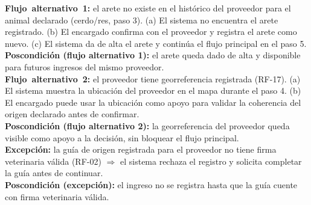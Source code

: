 \documentclass[11pt,a4paper]{article}
\begin{document}
\noindent\textbf{\mbox{Flujo alternativo 1}:} el arete no existe en el histórico del proveedor para el animal declarado (cerdo/res, paso 3). (a) El sistema no encuentra el arete registrado. (b) El encargado confirma con el proveedor y registra el arete como nuevo. (c) El sistema da de alta el arete y continúa el flujo principal en el paso 5.\\
\textbf{Poscondición (flujo alternativo 1):} el arete queda dado de alta y disponible para futuros ingresos del mismo proveedor.\\
\noindent\textbf{\mbox{Flujo alternativo 2}:} el proveedor tiene georreferencia registrada (RF-17). (a) El sistema muestra la ubicación del proveedor en el mapa durante el paso 4. (b) El encargado puede usar la ubicación como apoyo para validar la coherencia del origen declarado antes de confirmar.\\
\textbf{Poscondición (flujo alternativo 2):} la georreferencia del proveedor queda visible como apoyo a la decisión, sin bloquear el flujo principal.\\
\noindent\textbf{\mbox{Excepción}:} la guía de origen registrada para el proveedor no tiene firma veterinaria válida (RF-02) $\Rightarrow$ el sistema rechaza el registro y solicita completar la guía antes de continuar.\\
\textbf{Poscondición (excepción):} el ingreso no se registra hasta que la guía cuente con firma veterinaria válida.
\vspace{0.35cm}
\end{document}
